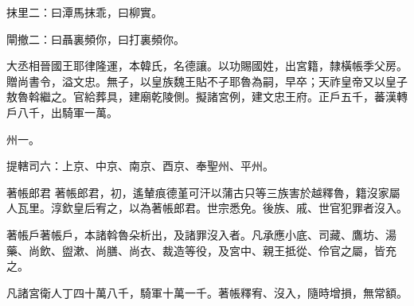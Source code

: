 \begin{pinyinscope}
 抹里二：曰潭馬抹乖，曰柳實。



 閘撤二：曰聶裏頻你，曰打裏頻你。



 大丞相晉國王耶律隆運，本韓氏，名德讓。以功賜國姓，出宮籍，隸橫帳季父房。贈尚書令，溢文忠。無子，以皇族魏王貼不子耶魯為嗣，早卒；天祚皇帝又以皇子敖魯斡繼之。官給葬具，建廟乾陵側。擬諸宮例，建文忠王府。正戶五千，蕃漢轉戶八千，出騎軍一萬。



 州一。



 提轄司六：上京、中京、南京、酉京、奉聖州、平州。



 著帳郎君
 著帳郎君，初，遙輦痕德堇可汗以蒲古只等三族害於越釋魯，籍沒家屬人瓦里。淳欽皇后宥之，以為著帳郎君。世宗悉免。後族、戚、世官犯罪者沒入。



 著帳戶著帳戶，本諸斡魯朵析出，及諸罪沒入者。凡承應小底、司藏、鷹坊、湯藥、尚飲、盥漱、尚膳、尚衣、裁造等役，及宮中、親王抵從、伶官之屬，皆充之。



 凡諸宮衛人丁四十萬八千，騎軍十萬一千。著帳釋宥、沒入，隨時增損，無常額。



\end{pinyinscope}